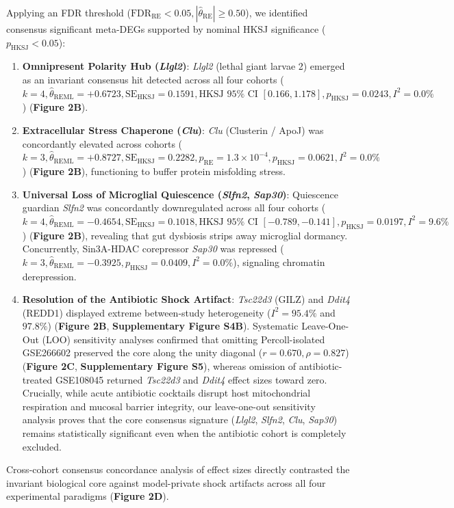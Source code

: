 \documentclass[10pt,a4paper]{article}
\begin{document}
Applying an FDR threshold ($\text{FDR}_{\text{RE}} < 0.05, |\hat{\theta}_{\text{RE}}| \ge 0.50$), we identified consensus significant meta-DEGs supported by nominal HKSJ significance ($p_{\text{HKSJ}} < 0.05$):
\begin{enumerate}
\item \textbf{Omnipresent Polarity Hub (\textit{Llgl2})}: \textit{Llgl2} (lethal giant larvae 2) emerged as an invariant consensus hit detected across all four cohorts ($k=4, \hat{\theta}_{\text{REML}} = +0.6723, \text{SE}_{\text{HKSJ}} = 0.1591, \text{HKSJ } 95\% \text{ CI } [0.166, 1.178], p_{\text{HKSJ}} = 0.0243, I^2 = 0.0\%$) (\textbf{Figure 2B}).
\item \textbf{Extracellular Stress Chaperone (\textit{Clu})}: \textit{Clu} (Clusterin / ApoJ) was concordantly elevated across cohorts ($k=3, \hat{\theta}_{\text{REML}} = +0.8727, \text{SE}_{\text{HKSJ}} = 0.2282, p_{\text{RE}} = 1.3 \times 10^{-4}, p_{\text{HKSJ}} = 0.0621, I^2 = 0.0\%$) (\textbf{Figure 2B}), functioning to buffer protein misfolding stress\cite{nuutinen2009_28,foster2019_29}.
\item \textbf{Universal Loss of Microglial Quiescence (\textit{Slfn2}, \textit{Sap30})}: Quiescence guardian \textit{Slfn2} was concordantly downregulated across all four cohorts ($k=4, \hat{\theta}_{\text{REML}} = -0.4654, \text{SE}_{\text{HKSJ}} = 0.1018, \text{HKSJ } 95\% \text{ CI } [-0.789, -0.141], p_{\text{HKSJ}} = 0.0197, I^2 = 9.6\%$) (\textbf{Figure 2B}), revealing that gut dysbiosis strips away microglial dormancy\cite{berger2010_31}. Concurrently, Sin3A-HDAC corepressor \textit{Sap30} was repressed ($k=3, \hat{\theta}_{\text{REML}} = -0.3925, p_{\text{HKSJ}} = 0.0409, I^2 = 0.0\%$), signaling chromatin derepression\cite{laherty1998_32}.
\item \textbf{Resolution of the Antibiotic Shock Artifact}: \textit{Tsc22d3} (GILZ) and \textit{Ddit4} (REDD1) displayed extreme between-study heterogeneity ($I^2 = 95.4\%$ and $97.8\%$) (\textbf{Figure 2B}, \textbf{Supplementary Figure S4B}). Systematic Leave-One-Out (LOO) sensitivity analyses confirmed that omitting Percoll-isolated GSE266602 preserved the core along the unity diagonal ($r = 0.670, \rho = 0.827$) (\textbf{Figure 2C}, \textbf{Supplementary Figure S5}), whereas omission of antibiotic-treated GSE108045 returned \textit{Tsc22d3} and \textit{Ddit4} effect sizes toward zero. Crucially, while acute antibiotic cocktails disrupt host mitochondrial respiration and mucosal barrier integrity\cite{kennedy2020_20}, our leave-one-out sensitivity analysis proves that the core consensus signature (\textit{Llgl2}, \textit{Slfn2}, \textit{Clu}, \textit{Sap30}) remains statistically significant even when the antibiotic cohort is completely excluded.
\end{enumerate}
Cross-cohort consensus concordance analysis of effect sizes directly contrasted the invariant biological core against model-private shock artifacts across all four experimental paradigms (\textbf{Figure 2D}).
\end{document}
